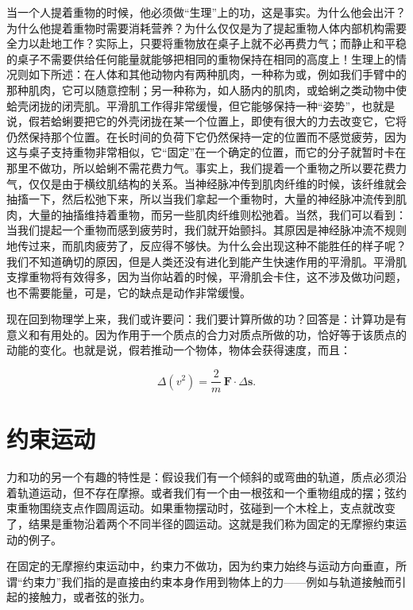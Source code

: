 \documentclass[12pt,oneside]{book}
\providecommand{\FLPvec}[1]{\boldsymbol{#1}}
\providecommand{\FLPF}[0]{\FLPvec{F}}
\providecommand{\FLPs}[0]{\FLPvec{s}}
\begin{document}
当一个人提着重物的时候，他必须做“生理”上的功，这是事实。为什么他会出汗？为什么他提着重物时需要消耗营养？为什么仅仅是为了提起重物人体内部机构需要全力以赴地工作？实际上，只要将重物放在桌子上就不必再费力气；而静止和平稳的桌子不需要供给任何能量就能够把相同的重物保持在相同的高度上！生理上的情况则如下所述：在人体和其他动物内有两种肌肉，一种称为或，例如我们手臂中的那种肌肉，它可以随意控制；另一种称为，如人肠内的肌肉，或蛤蜊之类动物中使蛤壳闭拢的闭壳肌。平滑肌工作得非常缓慢，但它能够保持一种“姿势”，也就是说，假若蛤蜊要把它的外壳闭拢在某一个位置上，即使有很大的力去改变它，它将仍然保持那个位置。在长时间的负荷下它仍然保持一定的位置而不感觉疲劳，因为这与桌子支持重物非常相似，它“固定”在一个确定的位置，而它的分子就暂时卡在那里不做功，所以蛤蜊不需花费力气。事实上，我们提着一个重物之所以要花费力气，仅仅是由于横纹肌结构的关系。当神经脉冲传到肌肉纤维的时候，该纤维就会抽搐一下，然后松弛下来，所以当我们拿起一个重物时，大量的神经脉冲流传到肌肉，大量的抽搐维持着重物，而另一些肌肉纤维则松弛着。当然，我们可以看到：当我们提起一个重物而感到疲劳时，我们就开始颤抖。其原因是神经脉冲流不规则地传过来，而肌肉疲劳了，反应得不够快。为什么会出现这种不能胜任的样子呢？我们不知道确切的原因，但是人类还没有进化到能产生快速作用的平滑肌。平滑肌支撑重物将有效得多，因为当你站着的时候，平滑肌会卡住，这不涉及做功问题，也不需要能量，可是，它的缺点是动作非常缓慢。


现在回到物理学上来，我们或许要问：我们要计算所做的功？回答是：计算功是有意义和有用处的。因为作用于一个质点的合力对质点所做的功，恰好等于该质点的动能的变化。也就是说，假若推动一个物体，物体会获得速度，而且：

\begin{equation*}
\Delta(v^2)=\frac{2}{m}\,\FLPF\cdot\Delta\FLPs.
\end{equation*}



\section{约束运动}
力和功的另一个有趣的特性是：假设我们有一个倾斜的或弯曲的轨道，质点必须沿着轨道运动，但不存在摩擦。或者我们有一个由一根弦和一个重物组成的摆；弦约束重物围绕支点作圆周运动。如果重物摆动时，弦碰到一个木栓上，支点就改变了，结果是重物沿着两个不同半径的圆运动。这就是我们称为固定的无摩擦约束运动的例子。

在固定的无摩擦约束运动中，约束力不做功，因为约束力始终与运动方向垂直，所谓“约束力”我们指的是直接由约束本身作用到物体上的力——例如与轨道接触而引起的接触力，或者弦的张力。
\end{document}
